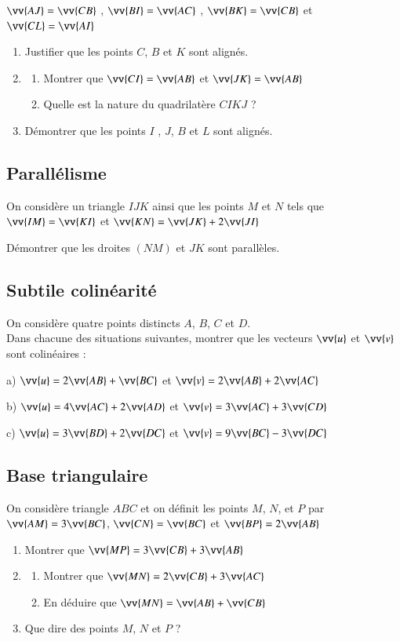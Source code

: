 \documentclass[oneside,12pt]{article}          %
\begin{document}
$\vv{AJ}=\vv{CB}$ \quad , \quad $\vv{BI}=\vv{AC}$ \quad , \quad $\vv{BK}=\vv{CB}$ \quad et \quad $\vv{CL}=\vv{AI}$
\begin{enumerate}
	\item Justifier que les points $C$, $B$ et $K$ sont alignés.
	\item \begin{enumerate}
		\item Montrer que $\vv{CI}=\vv{AB}$ et $\vv{JK}=\vv{AB}$
		\item Quelle est la nature du quadrilatère $CIKJ$ ?
	\end{enumerate}
	\item Démontrer que les points $I$ , $J$, $B$ et $L$ sont alignés.
\end{enumerate}



\subsection{Parallélisme}
On considère un triangle $IJK$ ainsi que les points $M$ et $N$ tels que $\vv{IM}=\vv{KI}$ et $\vv{KN}=\vv{JK}+2\vv{JI}$

Démontrer que les droites $(NM)$ et $JK$ sont parallèles.



\subsection{Subtile colinéarité}
On considère quatre points distincts $A$, $B$, $C$ et $D$.\\
Dans chacune des situations suivantes, montrer que les vecteurs $\vv{u}$ et $\vv{v}$ sont colinéaires :

a) $\vv{u}=2\vv{AB}+\vv{BC}$ \qquad et \qquad $\vv{v}=2\vv{AB}+2\vv{AC}$

b) $\vv{u}=4\vv{AC}+2\vv{AD}$ \qquad et \qquad $\vv{v}=3\vv{AC}+3\vv{CD}$

c) $\vv{u}=3\vv{BD}+2\vv{DC}$ \qquad et \qquad $\vv{v}=9\vv{BC}-3\vv{DC}$



\subsection{Base triangulaire}
On considère triangle $ABC$ et on définit les points $M$, $N$, et $P$ par $\vv{AM}=3\vv{BC}$, $\vv{CN}=\vv{BC}$ et $\vv{BP}=2\vv{AB}$
\begin{enumerate}
	\item Montrer que $\vv{MP}=3\vv{CB}+3\vv{AB}$
	\item \begin{enumerate}
		\item Montrer que $\vv{MN}=2\vv{CB}+3\vv{AC}$
		\item En déduire que $\vv{MN}=\vv{AB}+\vv{CB}$
	\end{enumerate}
	\item Que dire des points $M$, $N$ et $P$ ?
\end{enumerate}
 
\end{document}
